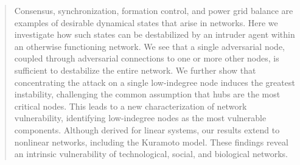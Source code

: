 \documentclass[%
 reprint,
 amsmath,amssymb,
 aip,
]{revtex4-2}
\theoremstyle{italichead}
\theoremstyle{definition}
\begin{document}
\begin{abstract}
Consensus, synchronization, formation control, and power grid balance are examples of desirable dynamical states that arise in networks. Here we investigate how such states can be destabilized by an intruder agent within an otherwise functioning network. We see that a single adversarial node, coupled through adversarial connections to one or more other nodes, is sufficient to destabilize the entire network. We further show that concentrating the attack on a single low-indegree node induces the greatest instability, challenging the common assumption that hubs are the most critical nodes. This leads to a new characterization of network vulnerability, identifying low-indegree nodes as the most vulnerable components. Although derived for linear systems, our results extend to nonlinear networks, including the Kuramoto model. These findings reveal an intrinsic vulnerability of technological, social, and biological networks.
\end{abstract}

\maketitle
\end{document}
